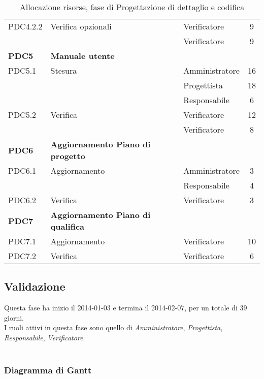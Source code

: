 \begin{table}[H]
\begin{tabular}{ l l l c  }
	\cline{3-4}
	PDC4.2.2 & Verifica opzionali & Verificatore & 9\\	
	& & Verificatore & 9\\
	\hline
	\textbf{PDC5} & \textbf{Manuale utente} \\
	\cline{3-4}
	PDC5.1 & Stesura  & Amministratore & 16\\ 
	 & & Progettista & 18\\
	 & & Responsabile & 6\\
    \cline{3-4}
	PDC5.2 & Verifica & Verificatore &  12\\
	& & Verificatore & 8\\
	\hline
	\textbf{PDC6} & \textbf{Aggiornamento Piano di progetto} \\
	\cline{3-4}
	PDC6.1 & Aggiornamento  & Amministratore & 3\\ 
	 & & Responsabile & 4\\
    \cline{3-4}
	PDC6.2 & Verifica & Verificatore &  3\\
	\hline
	\textbf{PDC7} & \textbf{Aggiornamento Piano di qualifica} \\
	\cline{3-4}
	PDC7.1 & Aggiornamento  & Verificatore & 10\\ 
    \cline{3-4}
	PDC7.2 & Verifica & Verificatore &  6\\
	\hline
	\end{tabular}
	\caption{Allocazione risorse, fase di Progettazione di dettaglio e codifica}
	\end{table}	
	
	
	\subsection{Validazione}
	
Questa fase ha inizio il 2014-01-03 e termina il 2014-02-07, per un totale di 39 giorni. \\
I ruoli attivi in questa fase sono quello di \textit{Amministratore}, \textit{Progettista}, \textit{Responsabile}, \textit{Verificatore}. \\ \\

\subsubsection{Diagramma di Gantt}

